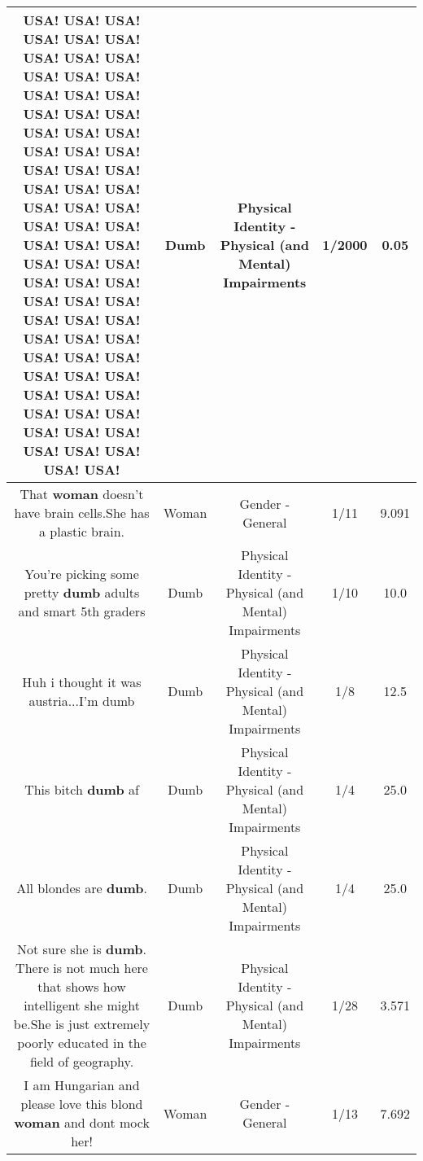 \documentclass[11pt]{article}
\newlength\mylength
\begin{document}
\begin{center}
\begin{longtable}{|C{.65\mylength}|C{.30\mylength}|C{.12\mylength}|C{.12\mylength}|C{.12\mylength}|}
USA! USA! USA! USA! USA! USA! USA! USA! USA! USA! USA! USA! USA! USA! USA! USA! USA! USA! USA! USA! USA! USA! USA! USA! USA! USA! USA! USA! USA! USA! USA! USA! USA! USA! USA! USA! USA! USA! USA! USA! USA! USA! USA! USA! USA! USA! USA! USA! USA! USA! USA! USA! USA! USA! USA! USA! USA! USA! USA! USA! USA! USA! USA! USA! USA! USA! USA! USA! USA! USA! USA! USA! USA! USA!\normalsize   & Dumb & Physical Identity - Physical (and Mental) Impairments & 1/2000 & 0.05 \\  \hline
  \small That \textbf{woman} doesn't have brain cells.She has a plastic brain.\normalsize   & Woman & Gender - General & 1/11 & 9.091 \\  \hline
  \small You're picking some pretty \textbf{dumb} adults and smart 5th graders\normalsize   & Dumb & Physical Identity - Physical (and Mental) Impairments & 1/10 & 10.0 \\  \hline
  \small Huh i thought it was austria...I'm dumb\normalsize   & Dumb & Physical Identity - Physical (and Mental) Impairments & 1/8 & 12.5 \\  \hline
  \small This bitch \textbf{dumb} af\normalsize   & Dumb & Physical Identity - Physical (and Mental) Impairments & 1/4 & 25.0 \\  \hline
  \small All blondes are \textbf{dumb}.\normalsize   & Dumb & Physical Identity - Physical (and Mental) Impairments & 1/4 & 25.0 \\  \hline
  \small Not sure she is \textbf{dumb}. There is not much here that shows how intelligent she might be.She is just extremely poorly educated in the field of geography.\normalsize   & Dumb & Physical Identity - Physical (and Mental) Impairments & 1/28 & 3.571 \\  \hline
  \small I am Hungarian and please love this blond \textbf{woman} and dont mock her!\normalsize   & Woman & Gender - General & 1/13 & 7.692 \\  \hline

\end{longtable}
\end{center}
\end{document}
